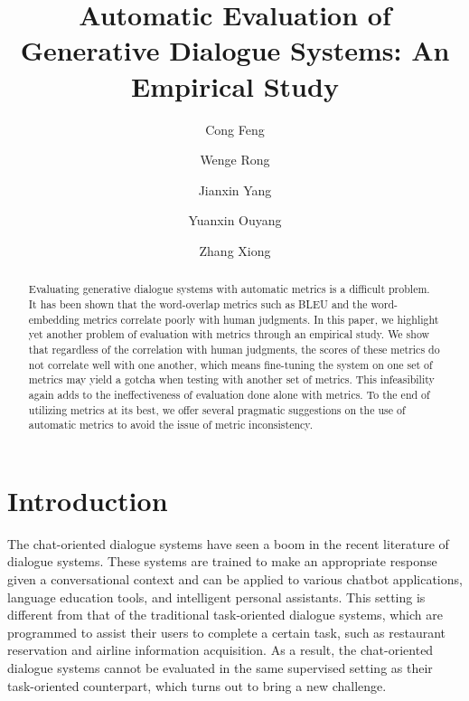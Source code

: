 \documentclass[runningheads]{llncs}
\begin{document}
    \title{Automatic Evaluation of Generative Dialogue Systems: An Empirical Study}
    \author{Cong Feng \and Wenge Rong \and Jianxin Yang  \and Yuanxin Ouyang  \and Zhang Xiong }

    \maketitle

    \begin{abstract}
        Evaluating generative dialogue systems with automatic metrics is a difficult problem. It has been shown that the word-overlap metrics such as BLEU and the word-embedding metrics correlate poorly with human judgments. In this paper, we highlight yet another problem of evaluation with metrics through an empirical study. We show that regardless of the correlation with human judgments, the scores of these metrics do not correlate well with one another, which means fine-tuning the system on one set of metrics may yield a gotcha when testing with another set of metrics. This infeasibility again adds to the ineffectiveness of evaluation done alone with metrics. To the end of utilizing metrics at its best, we offer several pragmatic suggestions on the use of automatic metrics to avoid the issue of metric inconsistency.
    \end{abstract}

    \section{Introduction}
    The chat-oriented dialogue systems have seen a boom in the recent literature of dialogue systems. These systems are trained to make an appropriate response given a conversational context and can be applied to various chatbot applications, language education tools, and intelligent personal assistants. This setting is different from that of the traditional task-oriented dialogue systems, which are programmed to assist their users to complete a certain task, such as restaurant reservation and airline information acquisition. As a result, the chat-oriented dialogue systems cannot be evaluated in the same supervised setting as their task-oriented counterpart, which turns out to bring a new challenge.
\end{document}
